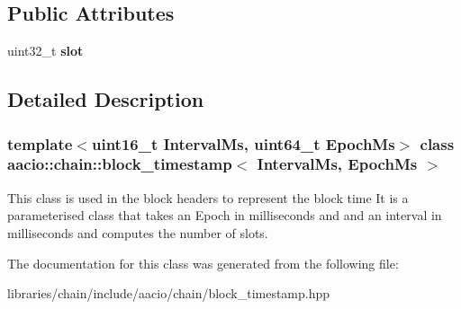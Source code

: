 \subsection*{Public Attributes}
\begin{DoxyCompactItemize}
\item 
\mbox{\label{classaacio_1_1chain_1_1block__timestamp_ac25776cbe1fa490c78d30b5808dd9ab2}} 
uint32\+\_\+t {\bfseries slot}
\end{DoxyCompactItemize}


\subsection{Detailed Description}
\subsubsection*{template$<$uint16\+\_\+t Interval\+Ms, uint64\+\_\+t Epoch\+Ms$>$\newline
class aacio\+::chain\+::block\+\_\+timestamp$<$ Interval\+Ms, Epoch\+Ms $>$}

This class is used in the block headers to represent the block time It is a parameterised class that takes an Epoch in milliseconds and and an interval in milliseconds and computes the number of slots. 

The documentation for this class was generated from the following file\+:\begin{DoxyCompactItemize}
\item 
libraries/chain/include/aacio/chain/block\+\_\+timestamp.\+hpp\end{DoxyCompactItemize}
